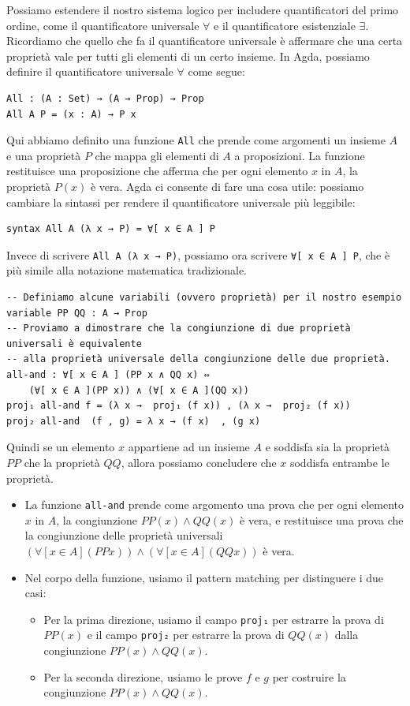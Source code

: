 \documentclass[a4paper]{article}
\theoremstyle{definition}
\theoremstyle{remark}
\begin{document}
Possiamo estendere il nostro sistema logico per includere quantificatori del 
primo ordine, come il quantificatore universale \( ∀ \) e il quantificatore esistenziale \( ∃ \).
Ricordiamo che quello che fa il quantificatore universale è affermare che 
una certa proprietà vale per tutti gli elementi di un certo insieme. 
In Agda, possiamo definire il quantificatore universale \( ∀ \) come segue:
\begin{verbatim}
All : (A : Set) → (A → Prop) → Prop
All A P = (x : A) → P x
\end{verbatim}
Qui abbiamo definito una funzione \texttt{All} che prende come argomenti un 
insieme \( A \) e una proprietà \( P \) che mappa gli elementi di \( A \) a 
proposizioni. La funzione restituisce una proposizione che afferma che per 
ogni elemento \( x \) in \( A \), la proprietà \( P(x) \) è vera.
Agda ci consente di fare una cosa utile: possiamo 
cambiare la sintassi per rendere il quantificatore universale più leggibile:
\begin{verbatim}
syntax All A (λ x → P) = ∀[ x ∈ A ] P
\end{verbatim}
Invece di scrivere \texttt{All A (λ x → P)}, possiamo ora scrivere
\texttt{∀[ x ∈ A ] P}, che è più simile alla notazione matematica tradizionale.
\begin{verbatim}
-- Definiamo alcune variabili (ovvero proprietà) per il nostro esempio
variable PP QQ : A → Prop 
-- Proviamo a dimostrare che la congiunzione di due proprietà universali è equivalente
-- alla proprietà universale della congiunzione delle due proprietà.
all-and : ∀[ x ∈ A ] (PP x ∧ QQ x) ⇔ 
    (∀[ x ∈ A ](PP x)) ∧ (∀[ x ∈ A ](QQ x))
proj₁ all-and f = (λ x →  proj₁ (f x)) , (λ x →  proj₂ (f x))
proj₂ all-and  (f , g) = λ x → (f x)  , (g x)  
\end{verbatim}
Quindi se un elemento $x$ appartiene ad un insieme $A$ e soddisfa sia la proprietà $PP$ che la proprietà $QQ$, allora possiamo concludere che $x$ soddisfa entrambe le proprietà.
\begin{itemize}
  \item La funzione \texttt{all-and} prende come argomento una prova che per ogni elemento \( x \) in \( A \), la congiunzione \( PP(x) ∧ QQ(x) \) è vera, e restituisce una prova che la congiunzione delle proprietà universali \( (∀[ x ∈ A ](PP x)) ∧ (∀[ x ∈ A ](QQ x)) \) è vera.
  \item Nel corpo della funzione, usiamo il pattern matching per distinguere i due casi:
    \begin{itemize}
      \item Per la prima direzione, usiamo il campo \texttt{proj₁} per estrarre la prova di \( PP(x) \) e il campo \texttt{proj₂} per estrarre la prova di \( QQ(x) \) dalla congiunzione \( PP(x) ∧ QQ(x) \).
      \item Per la seconda direzione, usiamo le prove \( f \) e \( g \) per costruire la congiunzione \( PP(x) ∧ QQ(x) \).
    \end{itemize}
\end{itemize}
\end{document}
